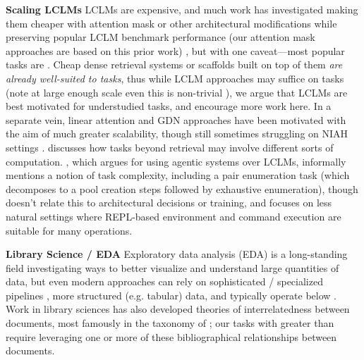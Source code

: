 \textbf{Scaling LCLMs}  LCLMs are expensive, and much work \citep{Acharya2024StarAE, Beltagy2020LongformerTL, Ivgi2022SLED, Lu2024TurboRAGAR, Xiao2025EfficientLCICL, Izacard2020LeveragingPR, Zaheer2020BigBT} has investigated making them cheaper with attention mask or other architectural modifications while preserving popular LCLM benchmark performance (our attention mask approaches are based on this prior work) \citep{Yen2024HELMETHT, Yang2018HotpotQAAD, Kocisk2017TheNR}, but with one caveat---most popular tasks are . Cheap dense retrieval systems \citep{Karpukhin2020DensePR, Khattab2020ColBERTEA} or scaffolds built on top of them \citep{Zhang2025RecursiveLM} \emph{are already well-suited to  tasks}, thus while  LCLM approaches may suffice on  tasks (note at large enough scale even this is non-trivial \cite{Lee2024CanLL}), we argue that LCLMs are best motivated for understudied  tasks, and encourage more work here. In a separate vein, linear attention \cite{Katharopoulos2020TransformersAR} and GDN \cite{Yang2024GatedDN} approaches have been motivated with the aim of much greater scalability, though still sometimes struggling on  NIAH settings \cite{Hsieh2024RULERWT}. \cite{Goldman2024IsIR} discusses how tasks beyond retrieval may involve different sorts of computation. \citep{Zhang2025RecursiveLM}, which argues for using agentic systems over LCLMs, informally mentions a notion of task complexity, including a pair enumeration task (which decomposes to a  pool creation steps followed by exhaustive enumeration), though doesn't relate this to architectural decisions or training, and focuses on less natural settings where REPL-based environment and command execution are suitable for many operations.  %



\textbf{Library Science / EDA} Exploratory data analysis (EDA) is a long-standing field \citep{Tukey1962TheFO} investigating ways to better visualize and understand large quantities of data, but even modern approaches can rely on sophisticated / specialized pipelines \cite{Shankar2024DocETLAQ}, more structured (e.g. tabular) data, and typically operate below  \cname. Work in library sciences has also developed theories of interrelatedness between documents, most famously in the taxonomy of \citet{Tillett1991ATO}; our tasks with greater than  require leveraging one or more of these bibliographical relationships between documents.

